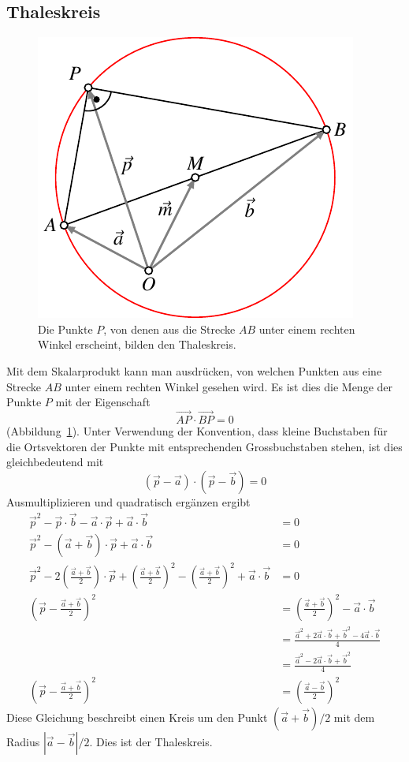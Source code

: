 \subsection{Thaleskreis}
\begin{figure}
\centering
\includegraphics{4/images/thales.pdf}
\caption{Die Punkte $P$, von denen aus die Strecke $AB$ unter einem
rechten Winkel erscheint, bilden den Thaleskreis.
\label{thales-graphik}}
\end{figure}
Mit dem Skalarprodukt kann man ausdrücken, von welchen Punkten aus
eine Strecke $AB$ unter einem rechten Winkel gesehen wird.
Es ist dies die Menge der Punkte $P$ mit der Eigenschaft
\[
\overrightarrow{AP}\cdot\overrightarrow{BP}=0
\]
(Abbildung~\ref{thales-graphik}).
Unter Verwendung der Konvention, dass kleine Buchstaben für die
Ortsvektoren der Punkte mit entsprechenden Grossbuchstaben stehen, ist
dies gleichbedeutend mit
\[
(\vec p-\vec a)\cdot(\vec p-\vec b)=0
\]
Ausmultiplizieren und quadratisch ergänzen ergibt
\begin{align*}
\vec p^2-\vec p\cdot\vec b-\vec a\cdot\vec p+\vec a\cdot\vec b&=0
\\
\vec p^2-(\vec a+\vec b)\cdot \vec p+\vec a\cdot\vec b&=0
\\
\vec p^2-2\left(\frac{\vec a+\vec b}{2}\right)\cdot \vec p
+\left(\frac{\vec a+\vec b}{2}\right)^2
-\left(\frac{\vec a+\vec b}{2}\right)^2
+\vec a\cdot\vec b&=0
\\
\left(\vec p
-\frac{\vec a+\vec b}{2}\right)^2&=
\left(\frac{\vec a+\vec b}{2}\right)^2-\vec a\cdot \vec b
\\
&=
\frac{\vec a^2+2\vec a\cdot\vec b+\vec b^2-4\vec a\cdot \vec b}{4}
\\
&=
\frac{\vec a^2-2\vec a\cdot\vec b+\vec b^2}{4}
\\
\left(\vec p
-\frac{\vec a+\vec b}{2}\right)^2&=
\left(\frac{\vec a-\vec b}{2}\right)^2
\end{align*}
Diese Gleichung beschreibt einen Kreis um den Punkt $(\vec a+\vec b)/2$
mit dem Radius $|\vec a-\vec b|/2$.
Dies ist der Thaleskreis.

